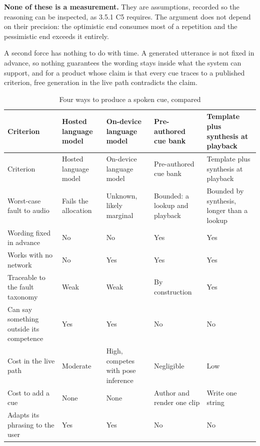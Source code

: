 \textbf{None of these is a measurement.} They are assumptions, recorded so the reasoning can be inspected, as 3.5.1 C5 requires. The argument does not depend on their precision: the optimistic end consumes most of a repetition and the pessimistic end exceeds it entirely.

A second force has nothing to do with time. A generated utterance is not fixed in advance, so nothing guarantees the wording stays inside what the system can support, and for a product whose claim is that every cue traces to a published criterion, free generation in the live path contradicts the claim.

{\footnotesize
\setlength{\LTpre}{6pt}\setlength{\LTpost}{8pt}
\begin{longtable}{>{\raggedright\arraybackslash}p{}>{\raggedright\arraybackslash}p{}>{\raggedright\arraybackslash}p{}>{\raggedright\arraybackslash}p{}>{\raggedright\arraybackslash}p{}}
\caption{Four ways to produce a spoken cue, compared}\\
\toprule
Criterion & Hosted language model & On-device language model & Pre-authored cue bank & Template plus synthesis at playback \\
\midrule
\endfirsthead
\toprule
Criterion & Hosted language model & On-device language model & Pre-authored cue bank & Template plus synthesis at playback \\
\midrule
\endhead
\bottomrule
\endfoot
\bottomrule
\endlastfoot
Worst-case fault to audio & Fails the allocation & Unknown, likely marginal & Bounded: a lookup and playback & Bounded by synthesis, longer than a lookup \\
Wording fixed in advance & No & No & Yes & Yes \\
Works with no network & No & Yes & Yes & Yes \\
Traceable to the fault taxonomy & Weak & Weak & By construction & Yes \\
Can say something outside its competence & Yes & Yes & No & No \\
Cost in the live path & Moderate & High, competes with pose inference & Negligible & Low \\
Cost to add a cue & None & None & Author and render one clip & Write one string \\
Adapts its phrasing to the user & Yes & Yes & No & No \\
\end{longtable}
}

